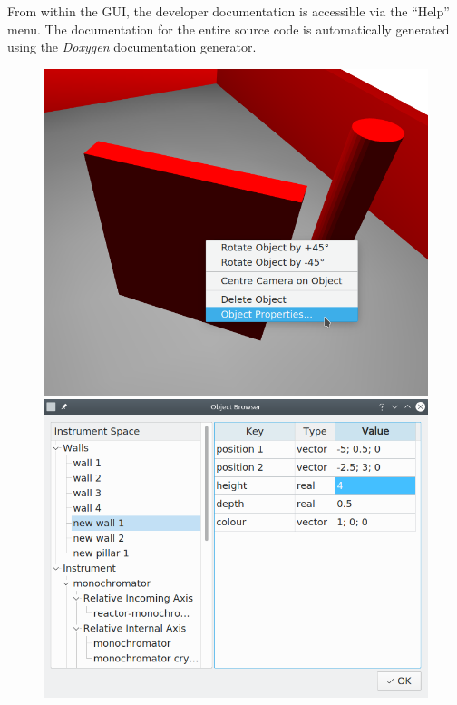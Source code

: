 From within the GUI, the developer documentation is accessible via the ``Help'' menu.
The documentation for the entire source code is automatically generated using 
the \textit{Doxygen} \cite{web_doxygen} documentation generator.


\begin{figure}[htb]
	\begin{minipage}{0.45 \textwidth}
		\begin{center}
			\includegraphics[width = 1 \textwidth]{figures/gui_object}
		\end{center}
	\end{minipage}
	\hspace{0.1cm}
	\begin{minipage}{0.5 \textwidth}
		\begin{center}
			\includegraphics[width = 1 \textwidth]{figures/gui_objbrowser}

\end{center}
\end{minipage}
\end{figure}
